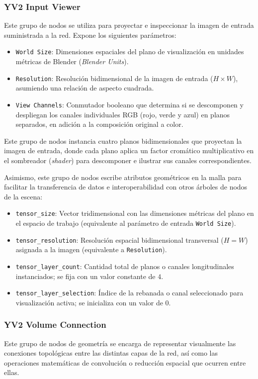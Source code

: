 \subsubsection{YV2 Input Viewer}
Este grupo de nodos se utiliza para proyectar e inspeccionar la imagen de entrada suministrada a la red. Expone los siguientes parámetros:

\begin{itemize}
    \item \texttt{World Size}: Dimensiones espaciales del plano de visualización en unidades métricas de Blender (\textit{Blender Units}).
    \item \texttt{Resolution}: Resolución bidimensional de la imagen de entrada ($H \times W$), asumiendo una relación de aspecto cuadrada.
    \item \texttt{View Channels}: Conmutador booleano que determina si se descomponen y despliegan los canales individuales RGB 
    (rojo, verde y azul) en planos separados, en adición a la composición original a color.
\end{itemize}
Este grupo de nodos instancia cuatro planos bidimensionales que proyectan la imagen de entrada, donde cada plano aplica un factor cromático 
multiplicativo en el sombreador (\textit{shader}) para descomponer e ilustrar sus canales correspondientes.
\medskip

Asimismo, este grupo de nodos escribe atributos geométricos en la malla para facilitar la transferencia de datos e interoperabilidad con 
otros árboles de nodos de la escena:

\begin{itemize}
    \item \texttt{tensor\_size}: Vector tridimensional con las dimensiones métricas del plano en el espacio de trabajo 
    (equivalente al parámetro de entrada \texttt{World Size}).
    \item \texttt{tensor\_resolution}: Resolución espacial bidimensional transversal ($H = W$) asignada a la imagen 
    (equivalente a \texttt{Resolution}).
    \item \texttt{tensor\_layer\_count}: Cantidad total de planos o canales longitudinales instanciados; se fija con 
    un valor constante de $4$.
    \item \texttt{tensor\_layer\_selection}: Índice de la rebanada o canal seleccionado para visualización activa; se 
    inicializa con un valor de $0$.
\end{itemize}

\subsubsection{YV2 Volume Connection}
Este grupo de nodos de geometría se encarga de representar visualmente las conexiones topológicas entre las distintas capas de la red, así como las operaciones 
matemáticas de convolución o reducción espacial que ocurren entre ellas. 
\medskip

